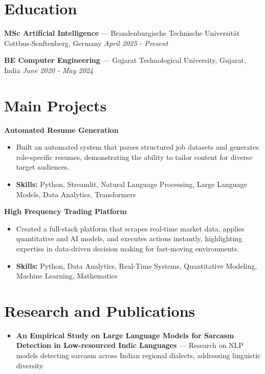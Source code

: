 \documentclass[a4paper,10pt]{article}
\begin{document}
\section*{Education}
\textbf{MSc Artificial Intelligence} — Brandenburgische Technische Universität Cottbus-Senftenberg, Germany \hfill \textit{April 2025 - Present}\par
\vspace{1.5pt}
\textbf{BE Computer Engineering} — Gujarat Technological University, Gujarat, India \hfill \textit{June 2020 - May 2024}\par

\section*{Main Projects}
\textbf{Automated Resume Generation}\par
\vspace{1pt}
\begin{itemize}
  \item Built an automated system that parses structured job datasets and generates role-specific resumes, demonstrating the ability to tailor content for diverse target audiences.
  \item \textbf{Skills:} Python, Streamlit, Natural Language Processing, Large Language Models, Data Analytics, Transformers
\end{itemize}
\vspace{3pt}
\textbf{High Frequency Trading Platform}\par
\vspace{1pt}
\begin{itemize}
  \item Created a full-stack platform that scrapes real-time market data, applies quantitative and AI models, and executes actions instantly, highlighting expertise in data-driven decision making for fast-moving environments.
  \item \textbf{Skills:} Python, Data Analytics, Real-Time Systems, Quantitative Modeling, Machine Learning, Mathematics
\end{itemize}

\section*{Research and Publications}
\begin{itemize}
\item \textbf{An Empirical Study on Large Language Models for Sarcasm Detection in Low-resourced Indic Languages} — Research on NLP models detecting sarcasm across Indian regional dialects, addressing linguistic diversity.
\end{itemize}
\end{document}
